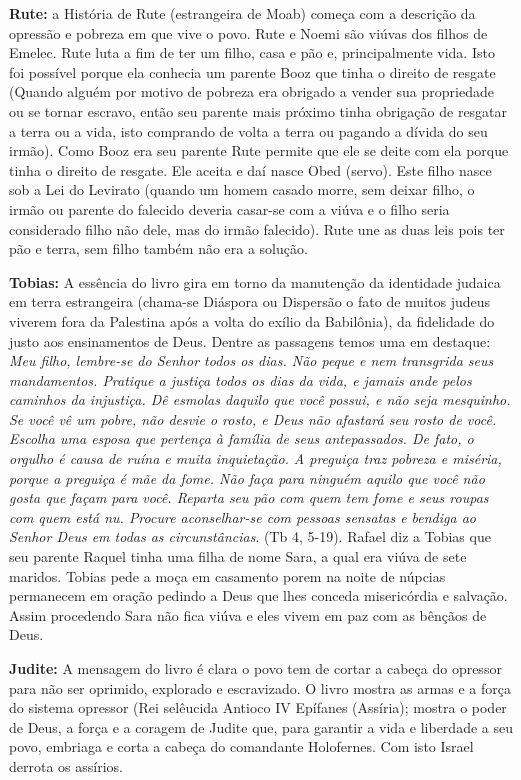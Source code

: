 \documentclass[
]{book}
\begin{document}
\textbf{Rute:} a História de Rute (estrangeira de Moab) começa com a descrição da opressão e pobreza em que vive o povo. Rute e Noemi são viúvas dos filhos de Emelec. Rute luta a fim de ter um filho, casa e pão e, principalmente vida. Isto foi possível porque ela conhecia um parente Booz que tinha o direito de resgate (Quando alguém por motivo de pobreza era obrigado a vender sua propriedade ou se tornar escravo, então seu parente mais próximo tinha obrigação de resgatar a terra ou a vida, isto comprando de volta a terra ou pagando a dívida do seu irmão). Como Booz era seu parente Rute permite que ele se deite com ela porque tinha o direito de resgate. Ele aceita e daí nasce Obed (servo). Este filho nasce sob a Lei do Levirato (quando um homem casado morre, sem deixar filho, o irmão ou parente do falecido deveria casar-se com a viúva e o filho seria considerado filho não dele, mas do irmão falecido). Rute une as duas leis pois ter pão e terra, sem filho também não era a solução.

\textbf{Tobias:} A essência do livro gira em torno da manutenção da identidade judaica em terra estrangeira (chama-se Diáspora ou Dispersão o fato de muitos judeus viverem fora da Palestina após a volta do exílio da Babilônia), da fidelidade do justo aos ensinamentos de Deus. Dentre as passagens temos uma em destaque: \emph{Meu filho, lembre-se do Senhor todos os dias. Não peque e nem transgrida seus mandamentos. Pratique a justiça todos os dias da vida, e jamais ande pelos caminhos da injustiça. Dê esmolas daquilo que você possui, e não seja mesquinho. Se você vê um pobre, não desvie o rosto, e Deus não afastará seu rosto de você. Escolha uma esposa que pertença à família de seus antepassados. De fato, o orgulho é causa de ruína e muita inquietação. A preguiça traz pobreza e miséria, porque a preguiça é mãe da fome. Não faça para ninguém aquilo que você não gosta que façam para você. Reparta seu pão com quem tem fome e seus roupas com quem está nu. Procure aconselhar-se com pessoas sensatas e bendiga ao Senhor Deus em todas as circunstâncias}. (Tb 4, 5-19). Rafael diz a Tobias que seu parente Raquel tinha uma filha de nome Sara, a qual era viúva de sete maridos. Tobias pede a moça em casamento porem na noite de núpcias permanecem em oração pedindo a Deus que lhes conceda misericórdia e salvação. Assim procedendo Sara não fica viúva e eles vivem em paz com as bênçãos de Deus.

\textbf{Judite:} A mensagem do livro é clara o povo tem de cortar a cabeça do opressor para não ser oprimido, explorado e escravizado. O livro mostra as armas e a força do sistema opressor (Rei selêucida Antioco IV Epífanes (Assíria); mostra o poder de Deus, a força e a coragem de Judite que, para garantir a vida e liberdade a seu povo, embriaga e corta a cabeça do comandante Holofernes. Com isto Israel derrota os assírios.
\end{document}
